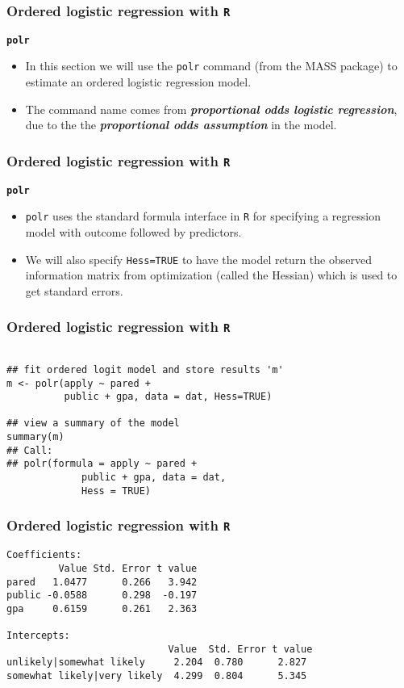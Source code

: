 \documentclass[00-GLMregslides.tex]{subfiles}
\begin{document}
\begin{frame}[fragile]
\frametitle{Ordered logistic regression with \texttt{R} }
	\Large
\textbf{\texttt{polr}}
\begin{itemize}
\item In this section we will use the \texttt{polr} command (from the MASS package) to estimate an ordered logistic 
regression model. 
\item The command name comes from \textbf{\textit{proportional odds logistic regression}}, due to the the \textbf{\textit{proportional odds assumption}} in the model. 
\end{itemize}
\end{frame}
\begin{frame}[fragile]
\frametitle{Ordered logistic regression with \texttt{R} }
	\Large
\textbf{\texttt{polr}}
\begin{itemize}
\item \texttt{polr} uses the standard formula interface in \texttt{R} for specifying a regression model with outcome 
followed by predictors. 
\item We will also specify \texttt{Hess=TRUE} to have the model return the observed information matrix from optimization (called the Hessian) which is used to get standard errors.
\end{itemize}
\end{frame}
\begin{frame}[fragile]
\frametitle{Ordered logistic regression with \texttt{R} }
\large
\begin{framed}		
\begin{verbatim}
	
## fit ordered logit model and store results 'm'
m <- polr(apply ~ pared + 
          public + gpa, data = dat, Hess=TRUE)

## view a summary of the model
summary(m)
## Call:
## polr(formula = apply ~ pared + 
             public + gpa, data = dat, 
             Hess = TRUE)
\end{verbatim}
\end{framed}
\end{frame}
\begin{frame}[fragile]
\frametitle{Ordered logistic regression with \texttt{R} }
	\normalsize
\begin{verbatim}
Coefficients:
         Value Std. Error t value
pared   1.0477      0.266   3.942
public -0.0588      0.298  -0.197
gpa     0.6159      0.261   2.363

Intercepts:
                            Value  Std. Error t value
unlikely|somewhat likely     2.204  0.780      2.827 
somewhat likely|very likely  4.299  0.804      5.345 

\end{verbatim}

\end{frame}
\end{document}
